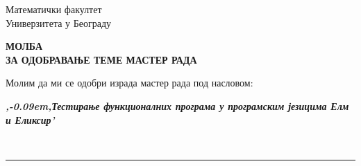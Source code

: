 \documentclass[a4paper]{article}
\def\zn{,\kern-0.09em,}
\begin{document}
\thispagestyle{empty}

\begin{flushleft}
Математички факултет\\
Универзитета у Београду
\end{flushleft}

\bigskip

\begin{center}
\textbf{МОЛБА\\
ЗА ОДОБРАВАЊЕ ТЕМЕ МАСТЕР РАДА
}\end{center}

\bigskip

\begin{flushleft}
Молим да ми се одобри израда мастер рада под насловом:
\end{flushleft}

\begin{minipage}{16.5cm}
\textbf{\textit{\zn Тестирање функционалних програма у  програмским језицима Елм и Еликсир'}}
\end{minipage}\\
\rule[4mm]{17.5cm}{.05mm}
\end{document}
